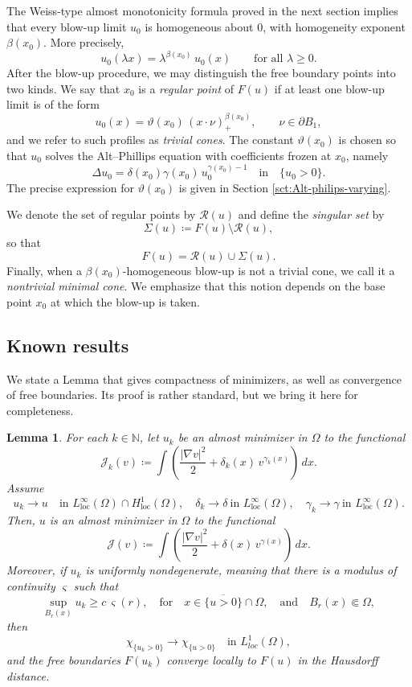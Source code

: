 \documentclass[reqno,11pt]{amsart}
\newtheorem{lemma}{Lemma}[section]
\newcommand{\1}{\mathds{1}}  %
\numberwithin{equation}{section}
\begin{document}
The Weiss-type almost monotonicity formula proved in the next section implies that every blow-up limit $u_0$ is homogeneous about $0$, with homogeneity exponent $\beta(x_0)$. More precisely,
\[
    u_0(\lambda x)=\lambda^{\beta(x_0)}\,u_0(x)
    \qquad\text{for all }\lambda\ge 0.
\]
After the blow-up procedure, we may distinguish the free boundary points into two kinds. We say that $x_0$ is a \emph{regular point} of $F(u)$ if at least one blow-up limit is of the form
\[
    u_0(x)=\vartheta(x_0)\,(x\cdot \nu)_+^{\beta(x_0)},\qquad \nu\in \partial B_1,
\]
and we refer to such profiles as \emph{trivial cones}. The constant $\vartheta(x_0)$ is chosen so that $u_0$ solves the Alt--Phillips equation with coefficients frozen at $x_0$, namely
\[
    \Delta u_0=\delta(x_0)\gamma(x_0)\,u_0^{\gamma(x_0)-1} \quad \text{in} \quad \{u_0>0\}.
\]
The precise expression for $\vartheta(x_0)$ is given in Section \ref{sct:Alt-philips-varying}.

We denote the set of regular points by $\mathcal{R}(u)$ and define the \emph{singular set} by
\[
    \Sigma(u)\coloneqq F(u)\setminus \mathcal{R}(u),
\]
so that
\[
    F(u)=\mathcal{R}(u)\cup \Sigma(u).
\]
Finally, when a $\beta(x_0)$-homogeneous blow-up is not a trivial cone, we call it a \emph{nontrivial minimal cone}. We emphasize that this notion depends on the base point $x_0$ at which the blow-up is taken.

\subsection{Known results}

We state a Lemma that gives compactness of minimizers, as well as convergence of free boundaries. Its proof is rather standard, but we bring it here for completeness.

\begin{lemma}\label{lemma:compactness}
For each $k\in\mathbb N$, let $u_k$ be an almost minimizer in $\Omega$ to the functional
\[
    \mathcal J_k(v) \coloneqq \int \left(\frac{|\nabla v|^2}{2} + \delta_k(x)\,v^{\gamma_k(x)}\right)\,dx.
\]
Assume
\[
u_k \to u \quad \text{in } L^\infty_{\mathrm{loc}}(\Omega)\cap H^1_{\mathrm{loc}}(\Omega),
\quad
\delta_k \to \delta \ \text{in } L^\infty_{\mathrm{loc}}(\Omega),
\quad
\gamma_k \to \gamma \ \text{in } L^\infty_{\mathrm{loc}}(\Omega).
\]
Then, $u$ is an almost minimizer in $\Omega$ to the functional
\[
    \mathcal J(v) \coloneqq \int \left(\frac{|\nabla v|^2}{2} + \delta(x)\,v^{\gamma(x)}\right)\,dx.
\]
Moreover, if $u_k$ is uniformly nondegenerate, meaning that there is a modulus of continuity $\varsigma$ such that
\[
    \sup_{B_r(x)} u_k \geq c\,\varsigma(r), \quad \text{for} \quad x \in \overline{\{u>0\}}\cap \Omega, \quad \text{and} \quad B_r(x) \Subset \Omega,
\]
then
\[
    \chi_{\{u_k>0\}} \to \chi_{\{u>0\}} \quad\text{in }L^1_{loc}(\Omega),
\]
and the free boundaries $F(u_k)$ converge locally to $F(u)$ in the Hausdorff distance.
\end{lemma}
\end{document}
